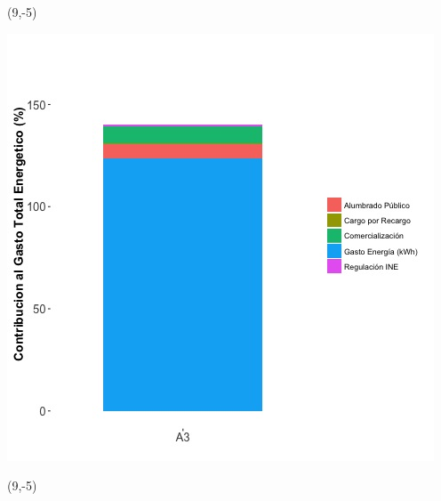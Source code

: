 \documentclass{article}\usepackage[]{graphicx}\usepackage[]{color}
\newenvironment{knitrout}{}{} %
\begin{document}
 \begin{textblock}{1}(9,-5)
\begin{minipage}{20em}
\begingroup

\endgroup
\end{minipage}
\end{textblock}

\begin{knitrout}
\color{fgcolor}
\includegraphics[scale=0.65]{figure/A3_costvars_plot.jpg} 
\end{knitrout}

 \begin{textblock}{1}(9,-5)
\begin{minipage}{20em}
\begingroup

\endgroup
\end{minipage}
\end{textblock}
\end{document}

